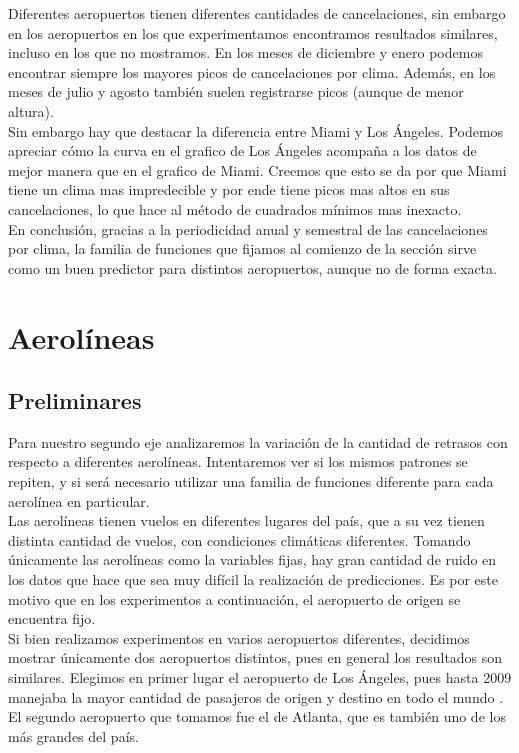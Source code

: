 Diferentes aeropuertos tienen diferentes cantidades de cancelaciones, sin embargo en los aeropuertos en los que experimentamos encontramos resultados similares, incluso en los que no mostramos. En los meses de diciembre y enero podemos encontrar siempre los mayores picos de cancelaciones por clima. Además, en los meses de julio y agosto también suelen registrarse picos (aunque de menor altura). \\

Sin embargo hay que destacar la diferencia entre Miami y Los Ángeles. Podemos apreciar cómo la curva en el grafico de Los Ángeles acompaña a los datos de mejor manera que en el grafico de Miami. Creemos que esto se da por que Miami tiene un clima mas impredecible y por ende tiene picos mas altos en sus cancelaciones, lo que hace al método de cuadrados mínimos mas inexacto.\\

En conclusión, gracias a la periodicidad anual y semestral de las cancelaciones por clima, la familia de funciones que fijamos al comienzo de la sección sirve como un buen predictor para distintos aeropuertos, aunque no de forma exacta. \\

\section{Aerolíneas}

\subsection{Preliminares}

Para nuestro segundo eje analizaremos la variación de la cantidad de retrasos con respecto a diferentes aerolíneas. Intentaremos ver si los mismos patrones se repiten, y si será necesario utilizar una familia de funciones diferente para cada aerolínea en particular. \\

Las aerolíneas tienen vuelos en diferentes lugares del país, que a su vez tienen distinta cantidad de vuelos, con condiciones climáticas diferentes. Tomando únicamente las aerolíneas como la variables fijas, hay gran cantidad de ruido en los datos que hace que sea muy difícil la realización de predicciones. Es por este motivo que en los experimentos a continuación, el aeropuerto de origen se encuentra fijo. \\

Si bien realizamos experimentos en varios aeropuertos diferentes, decidimos mostrar únicamente dos aeropuertos distintos, pues en general los resultados son similares. Elegimos en primer lugar el aeropuerto de Los Ángeles, pues hasta 2009 manejaba la mayor cantidad de pasajeros de origen y destino en todo el mundo \cite{LosAngelesAeropuerto}. El segundo aeropuerto que tomamos fue el de Atlanta, que es también uno de los más grandes del país. \\


